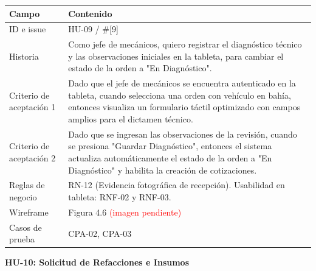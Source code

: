 {\def\LTcaptype{none} %
\begin{longtable}[]{@{}
  >{\raggedright\arraybackslash}p{}
  >{\raggedright\arraybackslash}p{}@{}}
\toprule\noalign{}
\begin{minipage}[b]{\linewidth}\raggedright
\textbf{Campo}
\end{minipage} & \begin{minipage}[b]{\linewidth}\raggedright
\textbf{Contenido}
\end{minipage} \\
\midrule\noalign{}
\endhead
\bottomrule\noalign{}
\endlastfoot
ID e issue & HU-09 / \#{[}9{]} \\
Historia & Como jefe de mecánicos, quiero registrar el diagnóstico
técnico y las observaciones iniciales en la tableta, para cambiar el
estado de la orden a "En Diagnóstico". \\
Criterio de aceptación 1 & Dado que el jefe de mecánicos se encuentra
autenticado en la tableta, cuando selecciona una orden con vehículo en
bahía, entonces visualiza un formulario táctil optimizado con campos
amplios para el dictamen técnico. \\
Criterio de aceptación 2 & Dado que se ingresan las observaciones de la
revisión, cuando se presiona "Guardar Diagnóstico", entonces el sistema
actualiza automáticamente el estado de la orden a "En Diagnóstico" y
habilita la creación de cotizaciones. \\
Reglas de negocio & RN-12 (Evidencia fotográfica de recepción).
Usabilidad en tableta: RNF-02 y RNF-03. \\
Wireframe & Figura 4.6 \textcolor{red}{(imagen pendiente)} \\
Casos de prueba & CPA-02, CPA-03 \\
\end{longtable}
}

\textbf{HU-10: Solicitud de Refacciones e Insumos}

